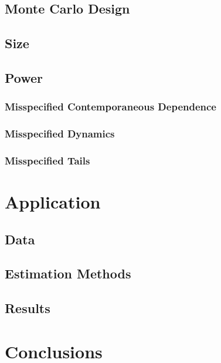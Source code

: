 \documentclass[12pt]{article}
\begin{document}
\subsection{Monte Carlo Design}
\subsection{Size}
\subsection{Power}
\subsubsection{Misspecified Contemporaneous Dependence}
\subsubsection{Misspecified Dynamics}
\subsubsection{Misspecified Tails}
\section{Application}
\subsection{Data}
\subsection{Estimation Methods}
\subsection{Results}
\section{Conclusions}



\end{document}
